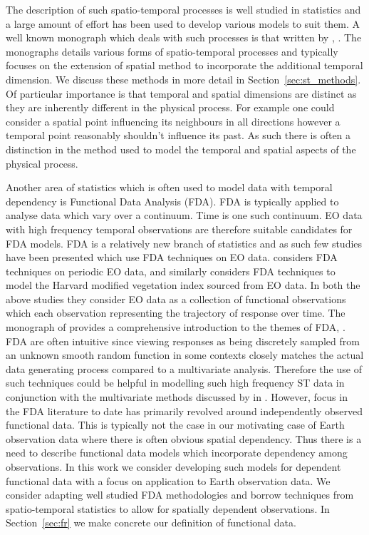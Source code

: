 The description of such spatio-temporal processes is well studied in statistics and a large amount of effort has been used to develop various models to suit them. A well known monograph which deals with such processes is that written by \citeauthor{cressie_statistics_2011}, \cite{cressie_statistics_2011}. The monographs details various forms of spatio-temporal processes and typically focuses on the extension of spatial method to incorporate the additional temporal dimension. We discuss these methods in more detail in Section~\ref{sec:st_methods}. Of particular importance is that temporal and spatial dimensions are distinct as they are inherently different in the physical process. For example one could consider a spatial point influencing its neighbours in all directions however a temporal point reasonably shouldn't influence its past. As such there is often a distinction in the method used to model the temporal and spatial aspects of the physical process.

Another area of statistics which is often used to model data with temporal dependency is Functional Data Analysis (FDA). FDA is typically applied to analyse data which vary over a continuum. Time is one such continuum. EO data with high frequency temporal observations are therefore suitable candidates for FDA models. FDA is a relatively new branch of statistics and as such few studies have been presented which use FDA techniques on EO data. \citeauthor{liu_functional_2012} considers FDA techniques on periodic EO data, \citep{liu_functional_2012} and similarly \citeauthor{hooker_maximal_2015} considers FDA techniques to model the Harvard modified vegetation index sourced from EO data. In both the above studies they consider EO data as a collection of functional observations which each observation representing the trajectory of response over time. The monograph of \citeauthor{ramsay_functional_2010} provides a comprehensive introduction to the themes of FDA, \citep{ramsay_functional_2010}. FDA are often intuitive since viewing responses as being discretely sampled from an unknown smooth random function in some contexts closely matches the actual data generating process compared to a multivariate analysis. Therefore the use of such techniques could be helpful in modelling such high frequency ST data in conjunction with the multivariate methods discussed by \citeauthor{cressie_statistics_2011} in \citep{cressie_statistics_2011}. However, focus in the FDA literature to date has primarily revolved around independently observed functional data. This is typically not the case in our motivating case of Earth observation data where there is often obvious spatial dependency. Thus there is a need to describe functional data models which incorporate dependency among observations. In this work we consider developing such models for dependent functional data with a focus on application to Earth observation data. We consider adapting well studied FDA methodologies and borrow techniques from spatio-temporal statistics to allow for spatially dependent observations. In Section~\ref{sec:fr} we make concrete our definition of functional data. 

